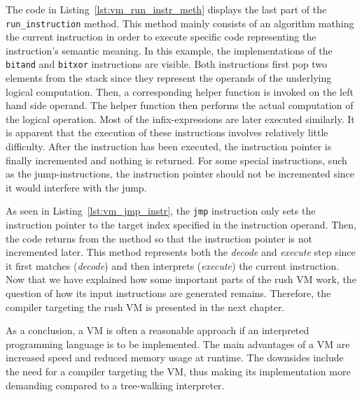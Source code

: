The code in Listing~\ref{lst:vm_run_instr_meth} displays the last part of the \texttt{run\_instruction} method.
This method mainly consists of an algorithm mathing the current instruction in order to execute specific code representing the instruction's semantic meaning.
In this example, the implementations of the \texttt{bitand} and \texttt{bitxor} instructions are visible.
Both instructions first pop two elements from the stack since they represent the operands of the underlying logical computation.
Then, a corresponding helper function is invoked on the left hand side operand.
The helper function then performs the actual computation of the logical operation.
Most of the infix-expressions are later executed similarly.
It is apparent that the execution of these instructions involves relatively little difficulty.
After the instruction has been executed, the instruction pointer is finally incremented and nothing is returned.
For some special instructions, such as the jump-instructions, the instruction pointer should not be incremented since it would interfere with the jump.


As seen in Listing~\ref{lst:vm_jmp_instr}, the \texttt{jmp} instruction only sets the instruction pointer to the target index specified in the instruction operand.
Then, the code returns from the method so that the instruction pointer is not incremented later.
This method represents both the \emph{decode} and \emph{execute} step since it first matches (\emph{decode}) and then interprets (\emph{execute}) the current instruction.
Now that we have explained how some important parts of the rush VM work,
the question of how its input instructions are generated remains.
Therefore, the compiler targeting the rush VM is presented in the next chapter.

As a conclusion, a VM is often a reasonable approach if an interpreted programming language is to be implemented.
The main advantages of a VM are increased speed and reduced memory usage at runtime.
The downsides include the need for a compiler targeting the VM, thus making its implementation more demanding compared to a tree-walking interpreter.
